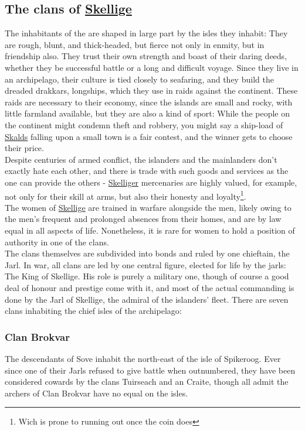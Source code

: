 \documentclass[parskip=full,11pt,%
footheight=38pt]{scrreport}
\begin{document}
\subsection{The clans of \hyperref[region:skellige]{Skellige}}\label{people:skellige}
The inhabitants of the  are shaped in large part by the isles they inhabit: They are rough, blunt,
and thick-headed, but fierce not only in enmity, but in friendship also. They trust their own strength and boast of their
daring deeds, whether they be successful battle or a long and difficult voyage. Since they live in an archipelago, their culture
is tied closely to seafaring, and they build the dreaded drakkars, longships, which they use in raids against the continent.
These raids are necessary to their economy, since the islands are small and rocky, with little farmland available, but they are
also a kind of sport: While the people on the continent might condemn theft and robbery, you might say a ship-load of \hyperref[people:skellige]{Skalds}
falling upon a small town is a fair contest, and the winner gets to choose their price.
\\[1ex]
Despite centuries of armed conflict, the islanders and the mainlanders don't exactly hate each other, and there is trade with
such goods and services as the one can provide the others - \hyperref[region:skellige]{Skelliger} mercenaries are highly valued,
for example, not only for their skill at arms, but also their honesty and loyalty\footnote{Wich is prone to running out once the coin does}.
\\[1ex]
The women of \hyperref[region:skellige]{Skellige} are trained in warfare alongside the men, likely owing to the men's frequent and prolonged
absences from their homes, and are by law equal in all aspects of life. Nonetheless, it is rare for women to hold a position of authority
in one of the clans.
\\[2ex]
The clans themselves are subdivided into bonds and ruled by one chieftain, the Jarl. In war, all clans are led by one central figure,
elected for life by the jarls: The King of Skellige. His role is purely a military one, though of course a good deal of honour and prestige
come with it, and most of the actual commanding is done by the Jarl of Skellige, the admiral of the islanders' fleet. There are seven clans
inhabiting the chief isles of the archipelago:

\subsubsection{Clan Brokvar}
The descendants of Sove inhabit the north-east of the isle of Spikeroog. Ever since one of their Jarls refused to give battle when outnumbered, they have
been considered cowards by the clans Tuirseach and an Craite, though all admit the archers of Clan Brokvar have no equal on the isles.
\end{document}
